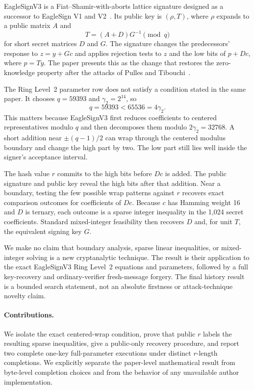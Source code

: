 \documentclass[10pt,a4paper]{article}
\begin{document}
EagleSignV3 is a Fiat--Shamir-with-aborts lattice signature designed as a
successor to EagleSign V1 and V2~\cite{target}. Its public key is
$(\rho,T)$, where $\rho$ expands to a public matrix $A$ and
\[
  T=(A+D)G^{-1}\pmod q
\]
for short secret matrices $D$ and $G$. The signature changes the predecessors'
response to $z=y+Gc$ and applies rejection tests to $z$ and the low bits of
$p+Dc$, where $p=Ty$. The paper presents this as the change that restores the
zero-knowledge property after the attacks of Pulles and
Tibouchi~\cite{pullestibouchi}.

The Ring Level~2 parameter row does not satisfy a condition stated in the same
paper. It chooses $q=59393$ and $\gamma_2=2^{14}$, so
\[
  q=59393 < 65536 = 4\gamma_2.
\]
This matters because EagleSignV3 first reduces coefficients to centered
representatives modulo $q$ and then decomposes them modulo
$2\gamma_2=32768$. A short addition near $\pm(q-1)/2$ can wrap through the
centered modulus boundary and change the high part by two. The low part still
lies well inside the signer's acceptance interval.

The hash value $r$ commits to the high bits before $Dc$ is added. The public
signature and public key reveal the high bits after that addition. Near a
boundary, testing the few possible wrap patterns against $r$ recovers exact
comparison outcomes for coefficients of $Dc$. Because $c$ has Hamming weight
16 and $D$ is ternary, each outcome is a sparse integer inequality in the
1,024 secret coefficients. Standard mixed-integer feasibility then recovers
$D$ and, for unit $T$, the equivalent signing key $G$.

We make no claim that boundary analysis, sparse linear inequalities, or
mixed-integer solving is a new cryptanalytic technique. The result is their
application to the exact EagleSignV3 Ring Level~2 equations and parameters,
followed by a full key-recovery and ordinary-verifier fresh-message forgery.
The final history result is a bounded search statement, not an absolute
firstness or attack-technique novelty claim.

\paragraph{Contributions.}
We isolate the exact centered-wrap condition, prove that public $r$ labels the
resulting sparse inequalities, give a public-only recovery procedure, and
report two complete one-key full-parameter executions under distinct
$r$-length completions. We explicitly separate the paper-level mathematical
result from byte-level completion choices and from the behavior of any
unavailable author implementation.
\end{document}
